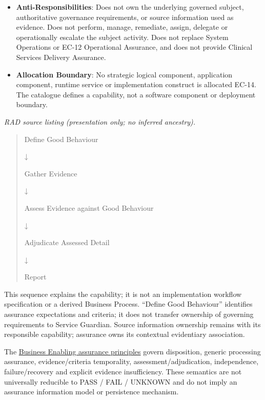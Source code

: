 \begin{itemize}
\item
\textbf{Anti-Responsibilities}: Does not own the underlying governed subject, authoritative governance requirements, or source information used as evidence. Does not perform, manage, remediate, assign, delegate or operationally escalate the subject activity. Does not replace System Operations or EC-12 Operational Assurance, and does not provide Clinical Services Delivery Assurance.



\item
\textbf{Allocation Boundary}: No strategic logical component, application component, runtime service or implementation construct is allocated EC-14. The catalogue defines a capability, not a software component or deployment boundary.



\end{itemize}

\textit{RAD source listing (presentation only; no inferred ancestry).}
\begin{quote}
Define Good Behaviour

↓

Gather Evidence

↓

Assess Evidence against Good Behaviour

↓

Adjudicate Assessed Detail

↓

Report
\end{quote}

This sequence explains the capability; it is not an implementation workflow specification or a derived Business Process. “Define Good Behaviour” identifies assurance expectations and criteria; it does not transfer ownership of governing requirements to Service Guardian. Source information ownership remains with its responsible capability; assurance owns its contextual evidentiary association.


The \href{https://github.com/fhirfactory/harmonia/blob/98410db60155198a75f74c79d98060070209faa1/docs/markdown/02-strategy/capabilities/business-enabling-capabilities.md\#health-service-assurance-approved-business-enabling-capabilities}{Business Enabling assurance principles} govern disposition, generic processing assurance, evidence/\allowbreak{}criteria temporality, assessment/\allowbreak{}adjudication, independence, failure/\allowbreak{}recovery and explicit evidence insufficiency. These semantics are not universally reducible to PASS /\allowbreak{} FAIL /\allowbreak{} UNKNOWN and do not imply an assurance information model or persistence mechanism.


